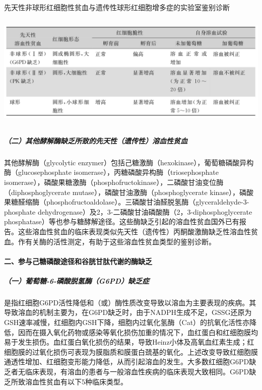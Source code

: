 \begin{table}[htbp]
\centering
\caption{先天性非球形红细胞性贫血与遗传性球形红细胞增多症的实验室鉴别诊断}
\label{tab33-7}
\includegraphics[width=5.9375in,height=2.15625in]{./images/Image00177.jpg}
\end{table}

\subparagraph{（二）其他酵解酶缺乏所致的先天性（遗传性）溶血性贫血}

其他酵解酶（glycolytic
enzymer）包括己糖激酶（hexokinase），葡萄糖磷酸异构酶（glucosephosphate
isomerase），丙糖磷酸异构酶（triosephosphate
isomerase），磷酸果糖激酶（phosphofructokinase），二磷酸甘油变位酶（diphosphoglycerate
mutase），磷酸甘油激酶（phosphoglycerate
kinase），磷酸果糖醛缩酶（phosphofructoaldolase）。三磷酸甘油醛脱氢酶（glyceraldehyde-3-phosphate
dehydrogenase）及2，3-二磷酸甘油磷酸酶（2，3-diphosphoglycerate
phosphatase）等也参与糖酵解途径。这些酶缺乏引起的溶血性贫血国外已有报告。这些溶血性贫血的临床表现类似先天性（遗传性）丙酮酸激酶缺乏性溶血性贫血。作有关酶的活性测定，有助于这些溶血性贫血类型的鉴别诊断。

\paragraph{二、参与己糖磷酸途径和谷胱甘肽代谢的酶缺乏}

\subparagraph{（一）葡萄糖-6-磷酸脱氢酶（G6PD）缺乏症}

是指红细胞G6PD活性降低和（或）酶性质改变导致以溶血为主要表现的疾病。其导致溶血的机制主要为，在G6PD缺乏时，由于NADPH生成不足，GSSG还原为GSH速率减慢，红细胞内GSH下降，细胞内过氧化氢酶（Cat）的抗氧化活性亦降低，因而在摄入氧化药物或感染等氧化损伤加重的情况下，血红蛋白和红细胞膜均易于发生损伤。血红蛋白氧化损伤的结果，导致Heinz小体及高氧血红素生成；红细胞膜的过氧化损伤可表现为膜脂质和膜蛋白巯基的氧化。上述改变导致红细胞膜通透性增加、红细胞变形能力降低，从而引起溶血的发生。大多数红细胞G6PD缺乏者无临床表现，有溶血的患者与一般溶血性疾病的临床表现大致相同。G6PD缺乏所致溶血性贫血有以下5种临床类型。

